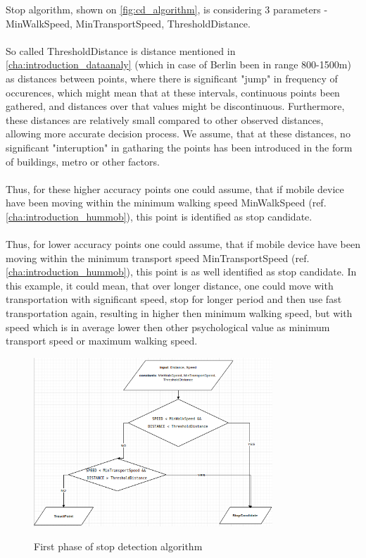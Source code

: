 Stop algorithm, shown on \autoref{fig:cd_algorithm}, is considering 3 parameters - MinWalkSpeed, MinTransportSpeed, ThresholdDistance. 
\\\\
So called ThresholdDistance is distance mentioned in \autoref{cha:introduction_dataanaly} (which in case of Berlin been in range 800-1500m) as distances between points, where there is significant "jump" in frequency of occurences, which might mean that at these intervals, continuous points been gathered, and distances over that values might be discontinuous. Furthermore, these distances are relatively small compared to other observed distances, allowing more accurate decision process. We assume, that at these distances, no significant "interuption" in gatharing the points has been introduced in the form of buildings, metro or other factors.
\\\\
Thus, for these higher accuracy points one could assume, that if mobile device have been moving within the minimum walking speed MinWalkSpeed (ref. \autoref{cha:introduction_hummob}), this point is identified as stop candidate. 
\\\\
Thus, for lower accuracy points one could assume, that if mobile device have been moving within the minimum transport speed MinTransportSpeed (ref. \autoref{cha:introduction_hummob}), this point is as well identified as stop candidate. In this example, it could mean, that over longer distance, one could move with transportation with significant speed, stop for longer period and then use fast transportation again, resulting in higher then minimum walking speed, but with speed which is in average lower then other psychological value as minimum transport speed or maximum walking speed.

\begin{figure}[!ht]
	\centering
	\includegraphics[width=0.8\textwidth]{images/stop_algorithm_1.png}\\
	\caption{First phase of stop detection algorithm  }
	\label{fig:cd_algorithm}
\end{figure}

